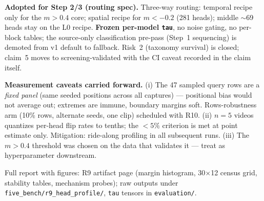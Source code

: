 \documentclass{article}
\begin{document}
\textbf{Adopted for Step 2/3 (routing spec).} Three-way routing: temporal
recipe only for the $m > 0.4$ core; spatial recipe for $m < -0.2$ (281 heads);
middle $\sim$69 heads stay on the L0 recipe. \textbf{Frozen per-model
\texttt{tau}}, no noise gating, no per-block tables; the source-only
classification pre-pass (Step~1 sequencing) is demoted from v1 default to
fallback. Risk~2 (taxonomy survival) is closed; claim~5 moves to
screening-validated with the CI caveat recorded in the claim itself.

\textbf{Measurement caveats carried forward.} (i) The 47 sampled query rows
are a \emph{fixed panel} (same seeded positions across all captures) ---
positional bias would not average out; extremes are immune, boundary margins
soft. Rows-robustness arm (10\% rows, alternate seeds, one clip) scheduled with
R10. (ii) $n = 5$ videos quantizes per-head flip rates to tenths; the
$< 5\%$ criterion is met at point estimate only. Mitigation: ride-along
profiling in all subsequent runs. (iii) The $m > 0.4$ threshold was chosen on
the data that validates it --- treat as hyperparameter downstream.

Full report with figures: R9 artifact page (margin histogram, 30$\times$12
census grid, stability tables, mechanism probes); raw outputs under
\texttt{five\_bench/r9\_head\_profile/}, \texttt{tau} tensors in
\texttt{evaluation/}.
\end{document}
